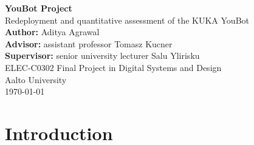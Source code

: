 \documentclass[a4paper, 12pt]{article}
\newcommand{\projectTitle}{YouBot Project}
\newcommand{\projectSubtitle}{Redeployment and quantitative assessment of the KUKA YouBot}
\newcommand{\authorName}{Aditya Agrawal}
\newcommand{\advisorName}{assistant professor Tomasz Kucner}
\newcommand{\supervisorName}{senior university lecturer Salu Ylirisku}
\newcommand{\courseName}{ELEC-C0302 Final Project in Digital Systems and Design}
\newcommand{\universityName}{Aalto University}
\newcommand{\commentout}[1]{}
\begin{document}
    \begin{titlepage}
        \raggedright
        

        \vspace*{2cm}

        {\Huge \textbf{\projectTitle}}\\[0.5cm]
        {\Large \projectSubtitle}\\[2cm]

        \textbf{Author:} \authorName\\[0.3cm]
        \textbf{Advisor:} \advisorName\\[0.3cm]
        \textbf{Supervisor:} \supervisorName\\[2cm]

        \courseName \\
        \universityName\\[0.5cm]
        \today

        \vfill
    \end{titlepage}
    \setcounter{tocdepth}{2} %
    \romantableofcontents

    \commentout{\section{Ideas \& Drafts (NOT ON FINAL REPORT)}
    structure: 
    My work
    reflection
    appendix: user manual

    things I did i want to add:
    - add in the initial project plan
    - add in the initial state of everything
    - known documentation

    - libfreenect and kinect camera
    - communication with onboard computer
    - enabling it to initially move through provided demos
    - utilising ROS1-ROS2 bridge (fail)
    - fixing the battery up 
    - writing my own programs to move the bot 
    
    - how did my goals change with time?
    - project management brief overview
    Teach and repeat background:
    https://furgalep.github.io/bib/mcmanus_icra12.pdf
    https://www.sciencedirect.com/science/article/pii/S0921889020304176
    https://arxiv.org/pdf/2309.15405
    https://clearpathrobotics.com/blog/2018/07/visual-teach-and-repeat-closer-look-part-1/}

    
    
    \section{Introduction}
\end{document}
